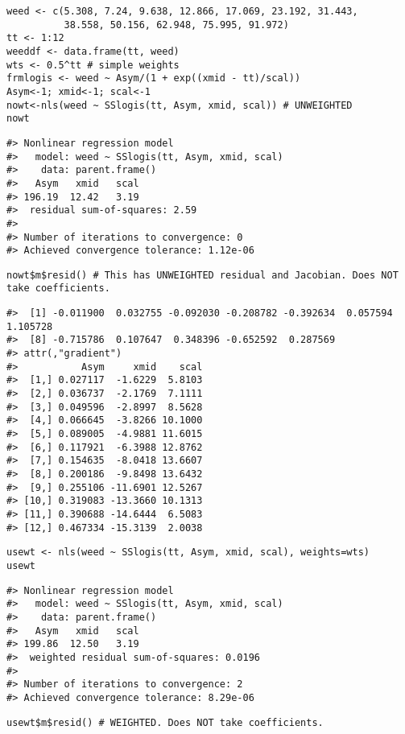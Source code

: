 \begin{verbatim}
weed <- c(5.308, 7.24, 9.638, 12.866, 17.069, 23.192, 31.443,
          38.558, 50.156, 62.948, 75.995, 91.972)
tt <- 1:12
weeddf <- data.frame(tt, weed)
wts <- 0.5^tt # simple weights
frmlogis <- weed ~ Asym/(1 + exp((xmid - tt)/scal))
Asym<-1; xmid<-1; scal<-1
nowt<-nls(weed ~ SSlogis(tt, Asym, xmid, scal)) # UNWEIGHTED
nowt
\end{verbatim}

\begin{verbatim}
#> Nonlinear regression model
#>   model: weed ~ SSlogis(tt, Asym, xmid, scal)
#>    data: parent.frame()
#>   Asym   xmid   scal 
#> 196.19  12.42   3.19 
#>  residual sum-of-squares: 2.59
#> 
#> Number of iterations to convergence: 0 
#> Achieved convergence tolerance: 1.12e-06
\end{verbatim}

\begin{verbatim}
nowt$m$resid() # This has UNWEIGHTED residual and Jacobian. Does NOT take coefficients.
\end{verbatim}

\begin{verbatim}
#>  [1] -0.011900  0.032755 -0.092030 -0.208782 -0.392634  0.057594  1.105728
#>  [8] -0.715786  0.107647  0.348396 -0.652592  0.287569
#> attr(,"gradient")
#>           Asym     xmid    scal
#>  [1,] 0.027117  -1.6229  5.8103
#>  [2,] 0.036737  -2.1769  7.1111
#>  [3,] 0.049596  -2.8997  8.5628
#>  [4,] 0.066645  -3.8266 10.1000
#>  [5,] 0.089005  -4.9881 11.6015
#>  [6,] 0.117921  -6.3988 12.8762
#>  [7,] 0.154635  -8.0418 13.6607
#>  [8,] 0.200186  -9.8498 13.6432
#>  [9,] 0.255106 -11.6901 12.5267
#> [10,] 0.319083 -13.3660 10.1313
#> [11,] 0.390688 -14.6444  6.5083
#> [12,] 0.467334 -15.3139  2.0038
\end{verbatim}

\begin{verbatim}
usewt <- nls(weed ~ SSlogis(tt, Asym, xmid, scal), weights=wts)
usewt
\end{verbatim}

\begin{verbatim}
#> Nonlinear regression model
#>   model: weed ~ SSlogis(tt, Asym, xmid, scal)
#>    data: parent.frame()
#>   Asym   xmid   scal 
#> 199.86  12.50   3.19 
#>  weighted residual sum-of-squares: 0.0196
#> 
#> Number of iterations to convergence: 2 
#> Achieved convergence tolerance: 8.29e-06
\end{verbatim}

\begin{verbatim}
usewt$m$resid() # WEIGHTED. Does NOT take coefficients.
\end{verbatim}

